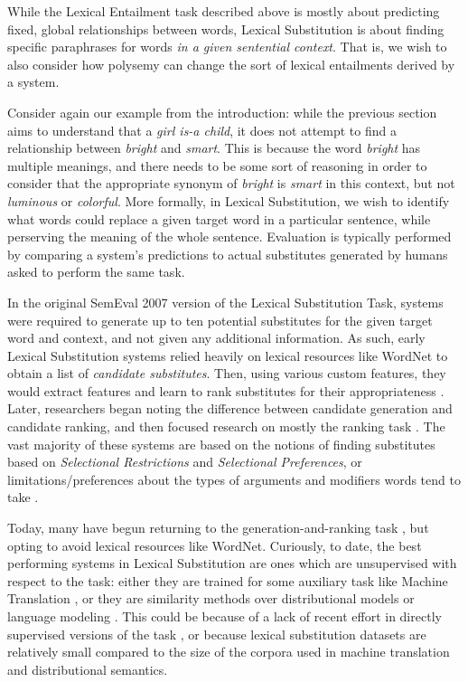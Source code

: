 \documentclass[12pt]{article}
\begin{document}
While the Lexical Entailment task described above is mostly about predicting
fixed, global relationships between words, Lexical Substitution is about
finding specific paraphrases for words {\em in a given sentential context}.
That is, we wish to also consider how polysemy can change the sort of
lexical entailments derived by a system.

Consider again our example from the introduction: while the previous section
aims to understand that a {\em girl is-a child}, it does not attempt to find a
relationship between {\em bright} and {\em smart}. This is because the word
{\em bright} has multiple meanings, and there needs to be some sort of
reasoning in order to consider that the appropriate synonym of {\em bright}
is {\em smart} in this context, but not {\em luminous} or {\em colorful}.
More formally, in Lexical Substitution, we wish to identify what
words could replace a given target word in a particular sentence, while
perserving the meaning of the whole sentence. Evaluation is typically
performed by comparing a system's predictions to actual substitutes generated
by humans asked to perform the same task.

In the original SemEval 2007 version of the Lexical Substitution Task, systems
were required to generate up to ten potential substitutes for the given target
word and context, and not given any additional information. As such, early
Lexical Substitution systems relied heavily on lexical resources like WordNet
to obtain a list of {\em candidate substitutes}. Then, using various custom
features, they would extract features and learn to rank substitutes for their
appropriateness \cite{mccarthy:2007:semeval}. Later, researchers began noting
the difference between candidate generation and candidate ranking, and then
focused research on mostly the ranking task \cite{needcite}. The vast majority
of these systems are based on the notions of finding substitutes based on {\em
Selectional Restrictions} and {\em Selectional Preferences}, or
limitations/preferences about the types of arguments and modifiers words tend
to take \cite{needcite}.

Today, many have begun returning to the generation-and-ranking task
\cite{melamud:2015:naacl,kawakami:2016:iclr,roller:2016:naacl,melamud:2016:conll},
but opting to avoid lexical resources like WordNet.  Curiously, to date, the
best performing systems in Lexical Substitution are ones which are unsupervised
with respect to the task: either they are trained for some auxiliary task like
Machine Translation \cite{kawakami:2016:iclr}, or they are similarity methods
over distributional models \cite{roller:2016:naacl} or language modeling
\cite{melamud:2015:naacl}. This could be because of a lack of recent effort in
directly supervised versions of the task \cite{szarvas:2013:naacl}, or because
lexical substitution datasets are relatively small compared to the size of the
corpora used in machine translation and distributional semantics.
\end{document}
